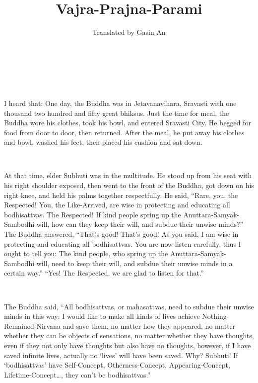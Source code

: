 \documentclass[a5paper,12pt]{book}
\title{Vajra-Prajna-Parami}
\author{Translated by Gasin An}
\date{}
\begin{document}
    \maketitle

    \pagestyle{empty}
    ~\newpage
    \pagestyle{headings}

    \setcounter{page}{1}

    ~

     I heard that: One day, the Buddha was in Jetavanavihara, Sravasti with one thousand two hundred and fifty great bhiksus. Just the time for meal, the Buddha wore his clothes, took his bowl, and entered Sravasti City. He begged for food from door to door, then returned. After the meal, he put away his clothes and bowl, washed his feet, then placed his cushion and sat down.

    ~

     At that time, elder Subhuti was in the multitude. He stood up from his seat with his right shoulder exposed, then went to the front of the Buddha, got down on his right knee, and held his palms together respectfully. He said, ``Rare, you, the Respected! You, the Like-Arrived, are wise in protecting and educating all bodhisattvas. The Respected! If kind people spring up the Anuttara-Samyak-Sambodhi will, how can they keep their will, and subdue their unwise minds?'' The Buddha answered, ``That's good! That's good! As you said, I am wise in protecting and educating all bodhisattvas. You are now listen carefully, thus I ought to tell you: The kind people, who spring up the Anuttara-Samyak-Sambodhi will, need to keep their will, and subdue their unwise minds in a certain way.'' ``Yes! The Respected, we are glad to listen for that.''

    ~

     The Buddha said, ``All bodhisattvas, or mahasattvas, need to subdue their unwise minds in this way: I would like to make all kinds of lives achieve Nothing-Remained-Nirvana and save them, no matter how they appeared, no matter whether they can be objects of sensations, no matter whether they have thoughts, even if they not only have thoughts but also have no thoughts, however, if I have saved infinite lives, actually no `lives' will have been saved. Why? Subhuti! If `bodhisattvas' have Self-Concept, Otherness-Concept, Appearing-Concept, Lifetime-Concept\dots{}, they can't be bodhisattvas.''

    ~
\end{document}
